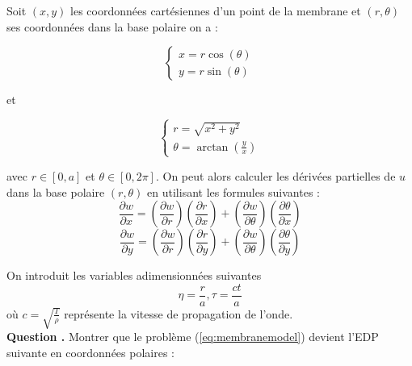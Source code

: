 \documentclass[a4,12pt]{article}
\newcounter{Nbquestion}
\newcommand*\question{%
  \stepcounter{Nbquestion}%
  \textbf{Question \theNbquestion. }}
\begin{document}
	      Soit $(x,y)$ les coordonnées cartésiennes d'un point de la membrane et $(r,\theta)$ ses coordonnées dans la base polaire on a :
	      \begin{center}
		\begin{minipage}[l]{.9\linewidth}

		  \begin{minipage}[l]{.4\linewidth}
		    \begin{equation*} 
		      \left\{ 
			\begin{array}{rcl}
			  x=r\cos(\theta) \\
			  y=r\sin(\theta)
			\end{array} 
			\right.
		      \end{equation*}
		    \end{minipage}
		    et
		    \begin{minipage}[r]{.4\linewidth}
		      \begin{equation*} 
			\left\{ 
			  \begin{array}{rcl}
			    r=\sqrt{x^2+y^2} \\
			    \theta=\arctan(\frac{y}{x})
			  \end{array} 
			  \right.
			\end{equation*}
		      \end{minipage}

		    \end{minipage}
		  \end{center}

		  avec $r \in[0,a]$ et $\theta  \in [0,2\pi]$. On peut alors calculer les dérivées partielles de $u$ dans la base polaire $(r,\theta)$ en utilisant les formules suivantes :
		  \[
		    \dfrac{\partial w}{\partial x}=\left(\dfrac{\partial w}{\partial r}\right)\left(\dfrac{\partial r}{\partial x}\right)+\left(\dfrac{\partial w}{\partial \theta}\right)\left(\dfrac{\partial \theta}{\partial x}\right)
		  \]
		  \[
		    \dfrac{\partial w}{\partial y}=\left(\dfrac{\partial w}{\partial r}\right)\left(\dfrac{\partial r}{\partial y}\right)+\left(\dfrac{\partial w}{\partial \theta}\right)\left(\dfrac{\partial \theta}{\partial y}\right)
		  \]

		  On introduit les variables adimensionnées suivantes 
		  \[
		    \eta=\dfrac{r}{a},\tau=\dfrac{ct}{a}
		  \]
		  où $c=\sqrt{\frac{T}{\rho}}$ représente la vitesse de propagation  de l'onde.\\ 


		  \question Montrer que le problème (\ref{eq:membranemodel}) devient l'EDP suivante en coordonnées polaires :\\
\end{document}
